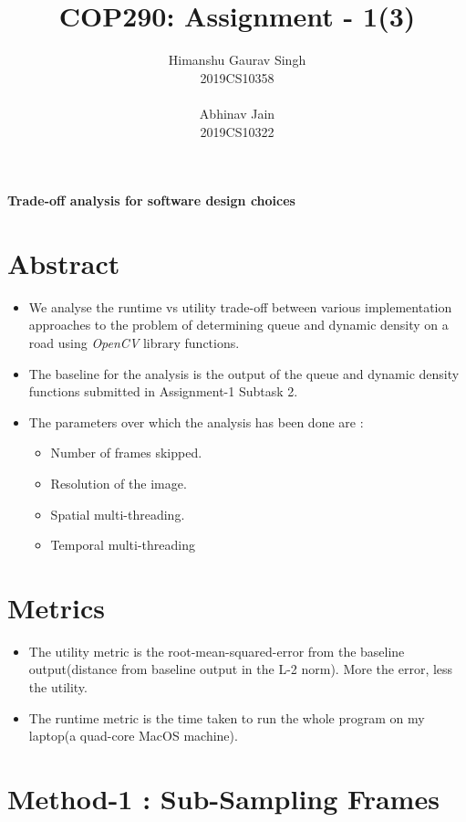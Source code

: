 \documentclass[a4paper]{article}
\title{COP290: Assignment - 1(3)}
\author{
Himanshu Gaurav Singh \\ 
2019CS10358 
\\ \\
Abhinav Jain \\
2019CS10322 \\  }
\begin{document}
\maketitle
\begin{center} \textbf{ \Large Trade-off analysis for software design choices} 
\end{center}
\section*{Abstract}
\begin{itemize}
\item We analyse the runtime vs utility trade-off between various implementation approaches to the problem of determining queue and dynamic density on a road using \textit{OpenCV} library functions.
\item The baseline for the analysis is the output of the queue and dynamic density functions submitted in Assignment-1 Subtask 2. 
\item The parameters over which the analysis has been done are : 
\begin{itemize}
    \item Number of frames skipped.
    \item Resolution of the image.
    \item Spatial multi-threading.
    \item Temporal multi-threading
\end{itemize} 
\end{itemize}    
\section *{Metrics}
\begin{itemize}
    \item The utility metric is the root-mean-squared-error from the baseline output(distance from baseline output in the L-2 norm). More the error, less the utility. 
    \item The runtime metric is the time taken to run the whole program on my laptop(a quad-core MacOS machine).
\end{itemize}
\section*{Method-1 : Sub-Sampling Frames}
\end{document}

